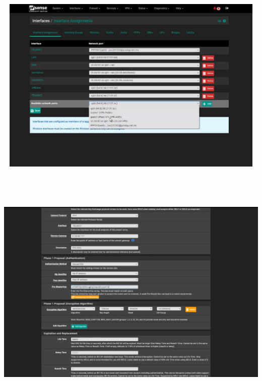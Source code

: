 \documentclass{article} %
\begin{document}
\noindent \includegraphics*[width=6.59in, height=3.35in, trim=0.16in 0.87in 0.02in 0.30in]{image30}

\noindent 

\noindent 

\noindent \includegraphics*[width=6.41in, height=4.80in, trim=0.33in 0.00in 0.44in 0.00in]{image31}

\noindent 

\noindent 

\noindent 

\noindent 

\noindent 

\noindent 
\end{document}
